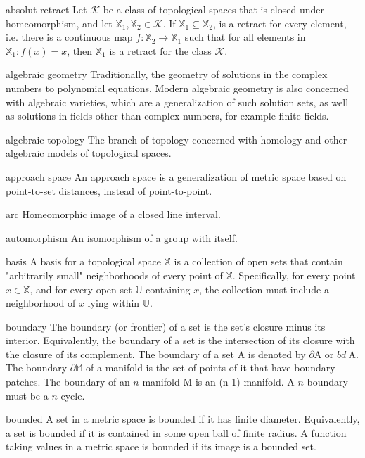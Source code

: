 \begin{description}
\begin{tiny}
\item[absolut retract] Let $\mathcal{K}$ be a class of topological spaces that is closed under homeomorphism, and let $\mathbb{X}_{1}, \mathbb{X}_{2} \in \mathcal{K}$. If $\mathbb{X}_{1} \subseteq \mathbb{X}_{2}$, is a retract for every element, i.e. there is a continuous map $f : \mathbb{X}_{2} \rightarrow \mathbb{X}_{1}$ such that for all elements in $\mathbb{X}_{1} : f(x) = x$, then $\mathbb{X}_{1}$ is a retract for the class $\mathcal{K}$. 
\item[algebraic geometry] Traditionally, the geometry of solutions in the complex numbers to polynomial equations. Modern algebraic geometry is also concerned with algebraic varieties, which are a generalization of such solution sets, as well as solutions in fields other than complex numbers, for example finite fields.
\item[algebraic topology] The branch of topology concerned with homology and other algebraic models of topological spaces.
\item[approach space] An approach space is a generalization of metric space based on point-to-set distances, instead of point-to-point.
\item[arc] Homeomorphic image of a closed line interval.
\item[automorphism] An isomorphism of a group with itself.
\item[basis] A basis for a topological space $\mathbb{X}$ is a collection of open sets that contain "arbitrarily small" neighborhoods of every point of $\mathbb{X}$. Specifically, for every point $x \in \mathbb{X}$, and for every open set $\mathbb{U}$ containing $x$, the collection must include a neighborhood of $x$ lying within $\mathbb{U}$. 
\item[boundary] The boundary (or frontier) of a set is the set's closure minus its interior. Equivalently, the boundary of a set is the intersection of its closure with the closure of its complement. The boundary of a set $\mathrm{A}$ is denoted by $\partial \mathrm{A}$ or $bd ~\mathrm{A}$. The boundary $\partial \mathbb{M}$ of a manifold is the set of points of it that have
boundary patches. The boundary of an $n$-manifold M is an (n-1)-manifold. A $n$-boundary must be a $n$-cycle.
\item[bounded] A set in a metric space is bounded if it has finite diameter. Equivalently, a set is bounded if it is contained in some open ball of finite radius. A function taking values in a metric space is bounded if its image is a bounded set.

\end{tiny}
\end{description}
